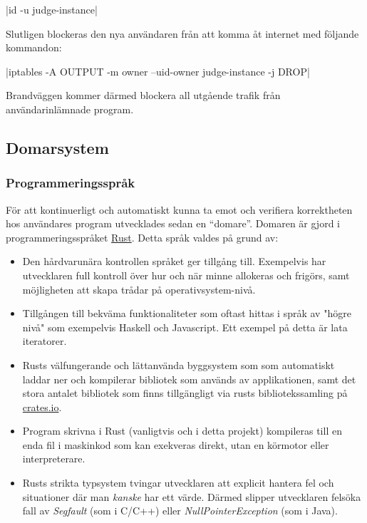 \documentclass{article}
\begin{document}
|id -u judge-instance|

Slutligen blockeras den nya användaren från att komma åt internet med följande
kommandon:

|iptables -A OUTPUT -m owner --uid-owner judge-instance -j DROP|

Brandväggen kommer därmed blockera all utgående trafik från användarinlämnade
program.

\subsection{Domarsystem}

\subsubsection{Programmeringsspråk}

För att kontinuerligt och automatiskt kunna ta emot och verifiera korrektheten
hos användares program utvecklades sedan en ``domare''. Domaren är gjord i
programmeringsspråket \href{https://rust-lang.org}{Rust}. Detta språk valdes på
grund av:

\begin{itemize}
	\item Den hårdvarunära kontrollen språket ger tillgång till. Exempelvis har
		utvecklaren full kontroll över hur och när minne allokeras och frigörs,
		samt möjligheten att skapa trådar på operativsystem-nivå.
	\item Tillgången till bekväma funktionaliteter som oftast hittas i språk av
		"högre nivå" som exempelvis Haskell och Javascript. Ett exempel på detta
		är lata iteratorer.
	\item Rusts välfungerande och lättanvända byggsystem som som automatiskt
		laddar ner och kompilerar bibliotek som används av applikationen, samt
		det stora antalet bibliotek som finns tillgängligt via rusts
		bibliotekssamling på \href{https://crates.io}{crates.io}.
	\item Program skrivna i Rust (vanligtvis och i detta projekt) kompileras
		till en enda fil i maskinkod som kan exekveras direkt, utan en körmotor
		eller interpreterare.
	\item Rusts strikta typsystem tvingar utvecklaren att explicit hantera fel
		och situationer där man \textit{kanske} har ett värde. Därmed slipper
		utvecklaren felsöka fall av \textit{Segfault} (som i C/C++) eller
		\textit{NullPointerException} (som i Java).
\end{itemize}
\end{document}
